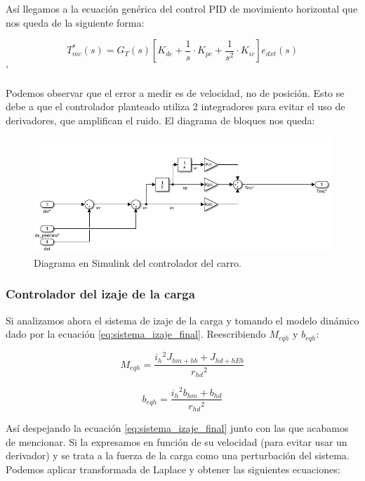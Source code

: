 \documentclass[11pt]{article}
\begin{document}
Así llegamos a la ecuación genérica del control PID de movimiento horizontal que nos queda de la siguiente forma:

\begin{equation}
	\label{eq:sistema_carro_simplificado_laplace_controlador}
	T_{mc}^{*}(s)=G_{T}(s)\left [ K_{dc}+\frac{1}{s}\cdot K_{pc}+\frac{1}{s^{2}}\cdot K_{ic} \right ] e_{dxt}(s)
\end{equation}'

Podemos observar que el error a medir es de velocidad, no de posición. Esto se debe a que el controlador planteado utiliza 2 integradores para evitar el uso de derivadores, que amplifican el ruido. El diagrama de bloques nos queda:

\begin{figure}[h!]
	\centering
	\includegraphics[width=1\textwidth]{images/imagen_12_controlador_carro.png}
	\caption{Diagrama en Simulink del controlador del carro.}
	\label{fig:controlador_carro_simulink}
\end{figure}


\subsubsection{Controlador del izaje de la carga}

Si analizamos ahora el sistema de izaje de la carga y tomando el modelo dinámico dado por la ecuación \ref{eq:sistema_izaje_final}. Reescribiendo $M_{eqh}$ y $b_{eqh}$:

\begin{equation}
	\label{eq:sistema_izaje_masa_equivalente}
	M_{eqh} = \frac{{i_{h}}^{2}J_{hm+hb}+J_{hd+hEb}}{{r_{hd}}^{2}}
\end{equation}

\begin{equation}
	\label{eq:sistema_izaje_friccion_equivalente}
	b_{eqh} = \frac{{i_{h}}^{2}b_{hm}+b_{hd}}{{r_{hd}}^{2}}
\end{equation}

Así despejando la ecuación \ref{eq:sistema_izaje_final} junto con las que acabamos de mencionar. Si la expresamos en función de su velocidad (para evitar usar un derivador) y se trata a la fuerza de la carga como una perturbación del sistema. Podemos aplicar transformada de Laplace y obtener las siguientes ecuaciones:
\end{document}
